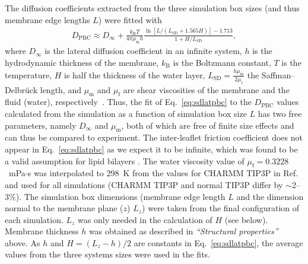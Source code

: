 \documentclass[journal=jctcce]{achemso}
\begin{document}
The diffusion coefficients extracted from the three simulation box sizes (and thus membrane edge lengths $L$) were fitted with
%
\begin{align}
	D_\mathrm{PBC}\approx D_\infty+\frac{k_\mathrm{B}T}{4\pi\mu_\mathrm{m}h}\frac{\ln\left[L/\left(L_\mathrm{SD}+1.565H\right)\right]-1.713}{1+H/L_\mathrm{SD}},
	\label{eq:sdlatpbc}
\end{align}
%
where $D_\infty$ is the lateral diffusion coefficient in an infinite system, $h$ is the hydrodynamic thickness of the membrane, $k_\mathrm{B}$ is the Boltzmann constant, $T$ is the temperature, $H$ is half the thickness of the water layer, $L_\mathrm{SD}=\frac{h\mu_\mathrm{m}}{2\mu_\mathrm{f}}$ the Saffman--Delbr\"{u}ck length, and $\mu_\mathrm{m}$ and $\mu_\mathrm{f}$ are shear viscosities of the membrane and the fluid (water), respectively~\cite{vogele2018hydrodynamics}. Thus, the fit of Eq.~\eqref{eq:sdlatpbc} to the $D_\mathrm{PBC}$ values calculated from the simulation as a function of simulation box size $L$ has two free parameters, namely $D_\infty$ and $\mu_\mathrm{m}$, both of which are free of finite size effects and can thus be compared to experiment. The inter-leaflet friction coefficient does not appear in Eq.~\eqref{eq:sdlatpbc} as we expect it to be infinite, which was found to be a valid assumption for lipid bilayers \cite{vogele2018hydrodynamics}. The water viscosity value of $\mu_\mathrm{f}= 0.3228$~mPa$\cdot$s was interpolated to 298~K from the values for CHARMM TIP3P in Ref.~ and used for all simulations (CHARMM TIP3P and normal TIP3P differ by $\sim$2--3\%). The simulation box dimensions (membrane edge length $L$ and the dimension normal to the membrane plane ($z$) $L_z$) were taken from the final configuration of each simulation. $L_z$ was only needed in the calculation of $H$ (see below). Membrane thickness $h$ was obtained as described in \textit{``Structural properties''} above. As $h$ and $H=(L_z-h)/2$ are constants in Eq.~\eqref{eq:sdlatpbc}, the average values from the three systems sizes were used in the fits. 
\end{document}
